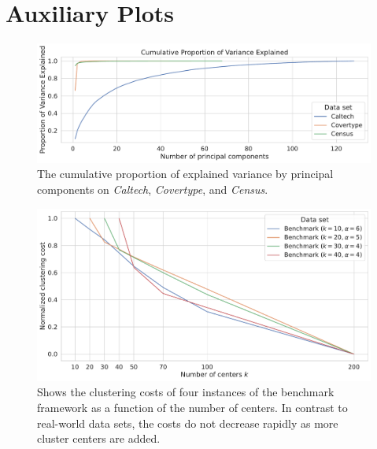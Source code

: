 \newpage
\section{Auxiliary Plots}


\begin{figure}[H]
  \includegraphics[width=0.9\linewidth]{figures/explained-variance-plot.pdf}
  \caption{The cumulative proportion of explained variance by principal components on \textit{Caltech}, \textit{Covertype}, and \textit{Census}.}
  \label{fig:explained-variance-pca}
\end{figure}

\begin{figure}[H]
  \includegraphics[width=0.9\linewidth]{figures/cost-curves-benchmark.pdf}
  \caption{Shows the clustering costs of four instances of the benchmark framework as a function of the number of centers. In contrast to real-world data sets, the costs do not decrease rapidly as more cluster centers are added.
  }
  \label{fig:cost-curves-benchmark}
\end{figure}



\newpage

